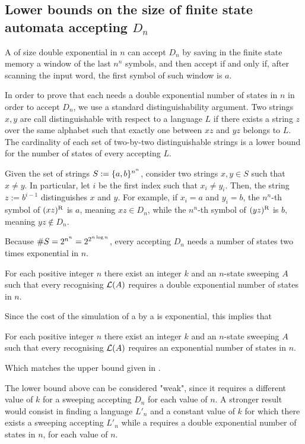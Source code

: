 \subsection[Size of finite state automata accepting \texorpdfstring{$D_n$}{Ln}]{Lower bounds on the size of finite state automata accepting $D_n$}
A \ODFA of size double exponential in $n$ can accept $D_n$ by saving in the finite state memory a window of the last $n^n$ symbols, and then accept if and only if, after scanning the input word, the first symbol of such window is $a$.

In order to prove that each \ODFA needs a double exponential number of states in $n$ in order to accept $D_n$, we use a standard distinguishability argument.
Two strings $x,y$ are call distinguishable with respect to a language $L$ if there exists a string $z$ over the same alphabet such that exactly one between $xz$ and $yz$ belongs to $L$.
The cardinality of each set of two-by-two distinguishable strings is a lower bound for the number of states of every \ODFA accepting $L$.

Given the set of strings $S:=\{a,b\}^{n^n}$, consider two strings $x,y\in S$ such that $x\ne y$.
In particular, let $i$ be the first index such that $x_i\ne y_i$.
Then, the string $z:=b^{i-1}$ distinguishes $x$ and $y$.
For example, if $x_i=a$ and $y_i=b$, the $n^n$-th symbol of $(xz)^{\mathrm R}$ is $a$, meaning $xz\in D_n$, while the $n^n$-th symbol of $(yz)^{\mathrm R}$ is $b$, meaning $yz\notin D_n$.

Because $\# S=2^{n^n}=2^{2^{n\log n}}$, every \ODFA accepting $D_n$ needs a number of states two times exponential in $n$.

\begin{thrm}
	For each positive integer $n$ there exist an integer $k$ and an $n$-state sweeping \kDLA $A$ such that every \ODFA recognising $\mathcal L(A)$ requires a double exponential number of states in $n$.
\end{thrm}

Since the cost of the simulation of a \ONFA by a \ODFA is exponential, this implies that

\begin{thrm}
	For each positive integer $n$ there exist an integer $k$ and an $n$-state sweeping \kDLA $A$ such that every \ONFA recognising $\mathcal L(A)$ requires an exponential number of states in $n$.
\end{thrm}

Which matches the upper bound given in .

The lower bound above can be considered "weak", since it requires a different value of $k$ for a sweeping \kDLA accepting $D_n$ for each value of $n$.
A stronger result would consist in finding a language $L'_n$ and a constant value of $k$ for which there exists a sweeping \kDLA accepting $L'_n$ while a \ODFA requires a double exponential number of states in $n$, for each value of $n$.
